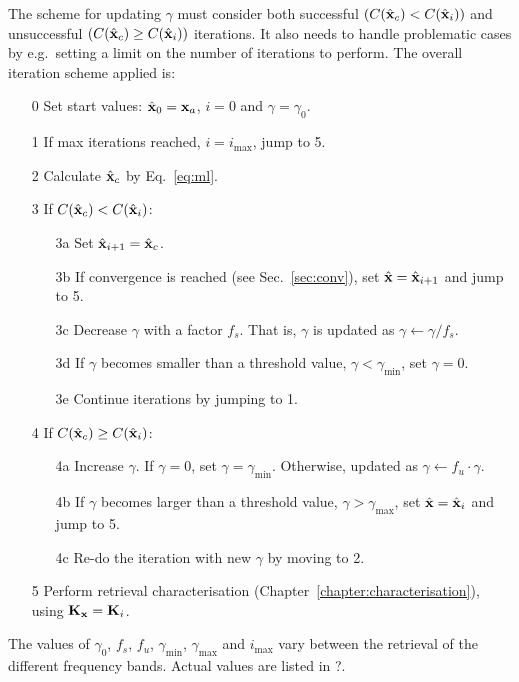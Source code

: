 The scheme for updating $\gamma$ must consider both successful
$(C(\hat{\mathbf{x}}_c) < C(\hat{\mathbf{x}}_i))$ and
unsuccessful $(C(\hat{\mathbf{x}}_c) \geq C(\hat{\mathbf{x}}_i))$ iterations. It also
needs to handle problematic cases by e.g.\ setting a limit on the number of
iterations to perform. The overall iteration scheme applied is:
\begin{itemize}
\item[0] Set start values: $\hat{\mathbf{x}}_0 = \mathbf{x}_{a}$, $i=0$ and $\gamma=\gamma_0$.
\item[1] If max iterations reached, $i=i_\mathrm{max}$, jump to 5. 
\item[2] Calculate $\hat{\mathbf{x}}_c$ by Eq.~\ref{eq:ml}.
\item[3] If $C(\hat{\mathbf{x}}_c) < C(\hat{\mathbf{x}}_i)$:
  \begin{itemize}
  \item[3a] Set $\hat{\mathbf{x}}_{i+1}=\hat{\mathbf{x}}_c$.
  \item[3b] If convergence is reached (see Sec.~\ref{sec:conv}), set
    $\hat{\mathbf{x}}=\hat{\mathbf{x}}_{i+1}$ and jump to 5.
  \item[3c] Decrease $\gamma$ with a factor $f_s$. That is, $\gamma$ is updated
    as $\gamma\leftarrow\gamma/f_s$. 
  \item[3d] If $\gamma$ becomes smaller than a 
    threshold value, $\gamma<\gamma_\mathrm{min}$, set $\gamma=0$.
  \item[3e] Continue iterations by jumping to 1.
  \end{itemize}
\item[4] If $C(\hat{\mathbf{x}}_c) \geq C(\hat{\mathbf{x}}_i)$:
  \begin{itemize}
  \item[4a] Increase $\gamma$. If $\gamma=0$, set $\gamma=\gamma_\mathrm{min}$.
    Otherwise, updated as $\gamma\leftarrow f_u\cdot\gamma$.
  \item[4b] If $\gamma$ becomes larger than a threshold value,
    $\gamma>\gamma_\mathrm{max}$, set $\hat{\mathbf{x}}=\hat{\mathbf{x}}_i$ and jump to 5.
  \item[4c] Re-do the iteration with new $\gamma$ by moving to 2.
  \end{itemize}
\item[5] Perform retrieval characterisation
  (Chapter~\ref{chapter:characterisation}), using $\mathbf{K}_{\mathbf{x}}=\mathbf{K}_{i}$.
\end{itemize}
The values of $\gamma_0$, $f_s$, $f_u$, $\gamma_\mathrm{min}$,
$\gamma_\mathrm{max}$ and $i_\mathrm{max}$ vary between the retrieval of the
different frequency bands. Actual values are listed in ?.
\\


